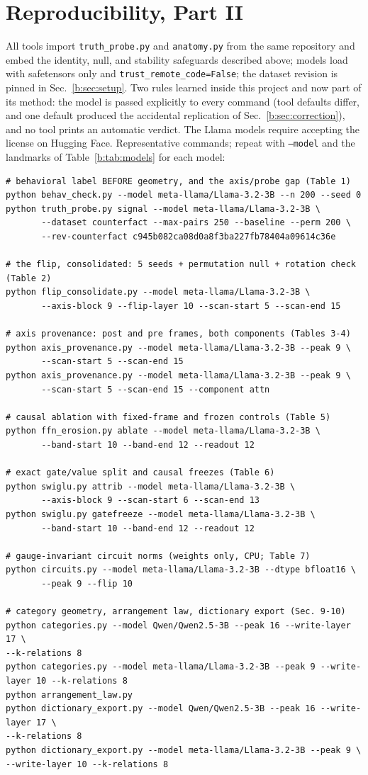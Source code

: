 \documentclass[11pt]{article}
\begin{document}
\section{Reproducibility, Part II}
\label{b:sec:repro}

All tools import \texttt{truth\_probe.py} and \texttt{anatomy.py} from the
same repository and embed the identity, null, and stability
safeguards described above; models load with safetensors only and
\texttt{trust\_remote\_code=False}; the dataset revision is pinned in
Sec.~\ref{b:sec:setup}. Two rules learned inside this project and now part of
its method: the model is passed explicitly to every command (tool defaults
differ, and one default produced the accidental replication of
Sec.~\ref{b:sec:correction}), and no tool prints an automatic verdict. The
Llama models require accepting the license on Hugging Face. Representative
commands; repeat with \texttt{--model} and the landmarks of
Table~\ref{b:tab:models} for each model:

\begin{verbatim}
# behavioral label BEFORE geometry, and the axis/probe gap (Table 1)
python behav_check.py --model meta-llama/Llama-3.2-3B --n 200 --seed 0
python truth_probe.py signal --model meta-llama/Llama-3.2-3B \
       --dataset counterfact --max-pairs 250 --baseline --perm 200 \
       --rev-counterfact c945b082ca08d0a8f3ba227fb78404a09614c36e

# the flip, consolidated: 5 seeds + permutation null + rotation check (Table 2)
python flip_consolidate.py --model meta-llama/Llama-3.2-3B \
       --axis-block 9 --flip-layer 10 --scan-start 5 --scan-end 15

# axis provenance: post and pre frames, both components (Tables 3-4)
python axis_provenance.py --model meta-llama/Llama-3.2-3B --peak 9 \
       --scan-start 5 --scan-end 15
python axis_provenance.py --model meta-llama/Llama-3.2-3B --peak 9 \
       --scan-start 5 --scan-end 15 --component attn

# causal ablation with fixed-frame and frozen controls (Table 5)
python ffn_erosion.py ablate --model meta-llama/Llama-3.2-3B \
       --band-start 10 --band-end 12 --readout 12

# exact gate/value split and causal freezes (Table 6)
python swiglu.py attrib --model meta-llama/Llama-3.2-3B \
       --axis-block 9 --scan-start 6 --scan-end 13
python swiglu.py gatefreeze --model meta-llama/Llama-3.2-3B \
       --band-start 10 --band-end 12 --readout 12

# gauge-invariant circuit norms (weights only, CPU; Table 7)
python circuits.py --model meta-llama/Llama-3.2-3B --dtype bfloat16 \
       --peak 9 --flip 10

# category geometry, arrangement law, dictionary export (Sec. 9-10)
python categories.py --model Qwen/Qwen2.5-3B --peak 16 --write-layer 17 \
--k-relations 8
python categories.py --model meta-llama/Llama-3.2-3B --peak 9 --write-layer 10 --k-relations 8
python arrangement_law.py
python dictionary_export.py --model Qwen/Qwen2.5-3B --peak 16 --write-layer 17 \
--k-relations 8
python dictionary_export.py --model meta-llama/Llama-3.2-3B --peak 9 \
--write-layer 10 --k-relations 8
\end{verbatim}
\end{document}
